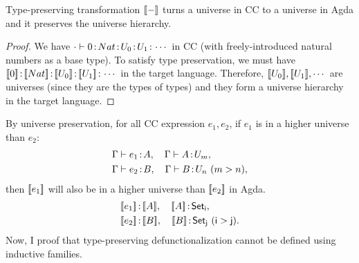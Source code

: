 \begin{lemma}
\label{lemma:universe}
Type-preserving transformation ${[\![ - ]\!]}$ turns a universe in CC to a universe in Agda and it preserves the universe hierarchy. 
\begin{proof} 
We have $\cdot \vdash 0 \hspace{0.5mm}{:}\hspace{0.5mm} Nat \hspace{0.5mm}{:}\hspace{0.5mm} U_0 \hspace{0.5mm}{:}\hspace{0.5mm} U_1 \hspace{0.5mm}{:}\hspace{0.5mm} \cdots$ in CC (with freely-introduced natural numbers as a base type). To satisfy type preservation, we must have $\bbracket{0} \goodcolon \bbracket{Nat} \goodcolon \bbracket{U_0}\goodcolon \bbracket{U_1} \goodcolon \cdots$ in the target language. 
Therefore, ${[\![ U_0 ]\!]}, {[\![ U_1 ]\!]}, \cdots$ are universes (since they are the types of types) and they form a universe hierarchy in the target language.
\end{proof}
\end{lemma}
By universe preservation, for all CC expression $e_1, e_2$, if $e_1$ is in a higher universe than $e_2$:
\begin{align*}
  & \Gamma \vdash e_1 \hspace{0.5mm}{:}\hspace{0.5mm} A, \quad \Gamma \vdash A \hspace{0.5mm}{:}\hspace{0.5mm} U_m, \\
  & \Gamma \vdash e_2 \hspace{0.5mm}{:}\hspace{0.5mm} B, \quad \Gamma \vdash B \hspace{0.5mm}{:}\hspace{0.5mm} U_n \ (m > n),
\end{align*}
then ${[\![ e_1 ]\!]}$ will also be in a higher universe than ${[\![ e_2 ]\!]}$ in Agda.
\begin{align*}
  & \bbracket{e_1} \goodcolon \bbracket{A}, \quad \bbracket{A} \goodcolon \mathsf{Set_i},\\
  & \bbracket{e_2} \goodcolon \bbracket{B}, \quad \bbracket{B} \goodcolon \mathsf{Set_j}\ (\mathsf{i > j}).
\end{align*}
Now, I proof that type-preserving defunctionalization cannot be defined using inductive families.


